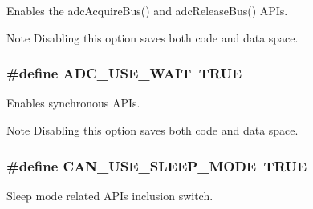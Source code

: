 Enables the {\ttfamily adc\+Acquire\+Bus()} and {\ttfamily adc\+Release\+Bus()} A\+P\+Is. 

\begin{DoxyNote}{Note}
Disabling this option saves both code and data space. 
\end{DoxyNote}
\hypertarget{group___h_a_l___c_o_n_f_ga39e892a4090185fbdda9bb105bc03b4f}{}
\subsubsection[{A\+D\+C\+\_\+\+U\+S\+E\+\_\+\+W\+A\+I\+T}]{\setlength{\rightskip}{0pt plus 5cm}\#define A\+D\+C\+\_\+\+U\+S\+E\+\_\+\+W\+A\+I\+T~T\+R\+U\+E}\label{group___h_a_l___c_o_n_f_ga39e892a4090185fbdda9bb105bc03b4f}


Enables synchronous A\+P\+Is. 

\begin{DoxyNote}{Note}
Disabling this option saves both code and data space. 
\end{DoxyNote}
\hypertarget{group___h_a_l___c_o_n_f_ga5294d9d12e4186c781df3b2f1d8bd80b}{}
\subsubsection[{C\+A\+N\+\_\+\+U\+S\+E\+\_\+\+S\+L\+E\+E\+P\+\_\+\+M\+O\+D\+E}]{\setlength{\rightskip}{0pt plus 5cm}\#define C\+A\+N\+\_\+\+U\+S\+E\+\_\+\+S\+L\+E\+E\+P\+\_\+\+M\+O\+D\+E~T\+R\+U\+E}\label{group___h_a_l___c_o_n_f_ga5294d9d12e4186c781df3b2f1d8bd80b}


Sleep mode related A\+P\+Is inclusion switch. 

\hypertarget{group___h_a_l___c_o_n_f_ga413a1b6c0ca2c9e524df50ceac1275fd}{}
